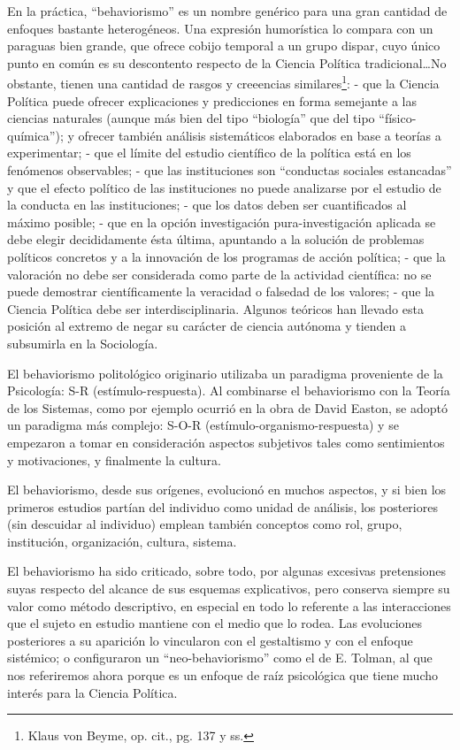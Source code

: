 \documentclass[
]{book}
\begin{document}
En la práctica, ``behaviorismo'' es un nombre genérico para una gran cantidad de enfoques bastante heterogéneos. Una expresión humorística lo compara con un paraguas bien grande, que ofrece cobijo temporal a un grupo dispar, cuyo único punto en común es su descontento respecto de la Ciencia Política tradicional\ldots No obstante, tienen una cantidad de rasgos y creeencias similares\footnote{Klaus von Beyme, op. cit., pg. 137 y ss.}: - que la Ciencia Política puede ofrecer explicaciones y predicciones en forma semejante a las ciencias naturales (aunque más bien del tipo ``biología'' que del tipo ``físico-química''); y ofrecer también análisis sistemáticos elaborados en base a teorías a experimentar; - que el límite del estudio científico de la política está en los fenómenos observables; - que las instituciones son ``conductas sociales estancadas'' y que el efecto político de las instituciones no puede analizarse por el estudio de la conducta en las instituciones; - que los datos deben ser cuantificados al máximo posible; - que en la opción investigación pura-investigación aplicada se debe elegir decididamente ésta última, apuntando a la solución de problemas políticos concretos y a la innovación de los programas de acción política; - que la valoración no debe ser considerada como parte de la actividad científica: no se puede demostrar científicamente la veracidad o falsedad de los valores; - que la Ciencia Política debe ser interdisciplinaria. Algunos teóricos han llevado esta posición al extremo de negar su carácter de ciencia autónoma y tienden a subsumirla en la Sociología.

El behaviorismo politológico originario utilizaba un paradigma proveniente de la Psicología: S-R (estímulo-respuesta). Al combinarse el behaviorismo con la Teoría de los Sistemas, como por ejemplo ocurrió en la obra de David Easton, se adoptó un paradigma más complejo: S-O-R (estímulo-organismo-respuesta) y se empezaron a tomar en consideración aspectos subjetivos tales como sentimientos y motivaciones, y finalmente la cultura.

El behaviorismo, desde sus orígenes, evolucionó en muchos aspectos, y si bien los primeros estudios partían del individuo como unidad de análisis, los posteriores (sin descuidar al individuo) emplean también conceptos como rol, grupo, institución, organización, cultura, sistema.

El behaviorismo ha sido criticado, sobre todo, por algunas excesivas pretensiones suyas respecto del alcance de sus esquemas explicativos, pero conserva siempre su valor como método descriptivo, en especial en todo lo referente a las interacciones que el sujeto en estudio mantiene con el medio que lo rodea. Las evoluciones posteriores a su aparición lo vincularon con el gestaltismo y con el enfoque sistémico; o configuraron un ``neo-behaviorismo'' como el de E. Tolman, al que nos referiremos ahora porque es un enfoque de raíz psicológica que tiene mucho interés para la Ciencia Política.
\end{document}
